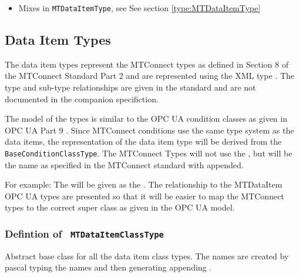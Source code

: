 \begin{itemize}
\item Mixes in \texttt{MTDataItemType}, see See section \ref{type:MTDataItemType}
\end{itemize}
\FloatBarrier
\subsection{Data Item Types} \label{model:DataItemTypes}

The data item types represent the MTConnect types as defined in Section 8 of the 
MTConnect Standard Part 2 \cite{MTCPart2} and are represented using the XML \gls{type} 
. The type and sub-type relationships are given in the standard and are 
not documented in the companion specifiction. 

The model of the types is similar to the OPC UA condition classes as given in OPC UA Part 9
\cite{UAPart9}. Since MTConnect conditions use the same type system as the data items, 
the representation of the data item type will be derived from the \texttt{BaseConditionClassType}. 
The MTConnect Types will not use the , but will be the name as specified
in the MTConnect standard with  appended.

For example: The  will be given as the . 
The relationship to the \gls{MTDataItem} OPC UA types are presented so that it will be
easier to map the MTConnect types to the correct super class as given in the OPC UA model.

\subsubsection{Defintion of \texttt{ MTDataItemClassType}}
  \label{type:MTDataItemClassType}

\FloatBarrier

Abstract base class for all the data item class types. The names are created by pascal typing the names
and then generating appending .

